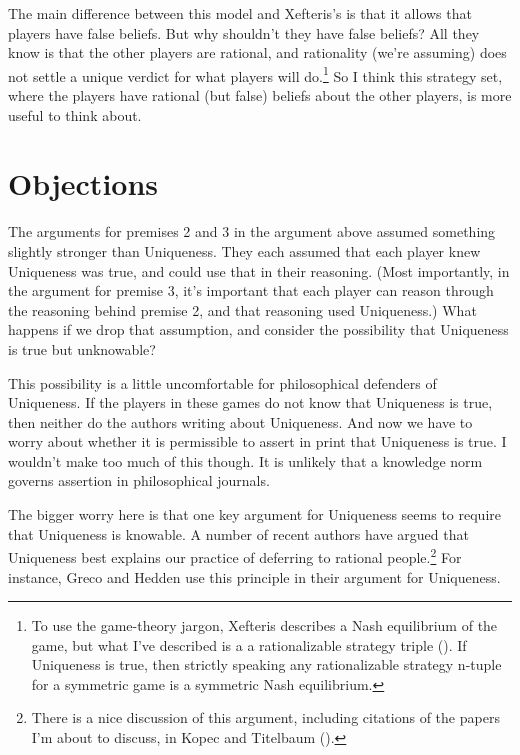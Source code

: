 \documentclass[
  11pt,
  letterpaper,
  DIV=11,
  numbers=noendperiod,
  twoside]{scrartcl}
\begin{document}
The main difference between this model and Xefteris's is that it allows
that players have false beliefs. But why shouldn't they have false
beliefs? All they know is that the other players are rational, and
rationality (we're assuming) does not settle a unique verdict for what
players will do.\footnote{To use the game-theory jargon, Xefteris
  describes a Nash equilibrium of the game, but what I've described is a
  a rationalizable strategy triple (). If Uniqueness is true, then strictly speaking any
  rationalizable strategy n-tuple for a symmetric game is a symmetric
  Nash equilibrium.} So I think this strategy set, where the players
have rational (but false) beliefs about the other players, is more
useful to think about.

\section{Objections}\label{objections}

The arguments for premises 2 and 3 in the argument above assumed
something slightly stronger than Uniqueness. They each assumed that each
player knew Uniqueness was true, and could use that in their reasoning.
(Most importantly, in the argument for premise 3, it's important that
each player can reason through the reasoning behind premise 2, and that
reasoning used Uniqueness.) What happens if we drop that assumption, and
consider the possibility that Uniqueness is true but unknowable?

This possibility is a little uncomfortable for philosophical defenders
of Uniqueness. If the players in these games do not know that Uniqueness
is true, then neither do the authors writing about Uniqueness. And now
we have to worry about whether it is permissible to assert in print that
Uniqueness is true. I wouldn't make too much of this though. It is
unlikely that a knowledge norm governs assertion in philosophical
journals.

The bigger worry here is that one key argument for Uniqueness seems to
require that Uniqueness is knowable. A number of recent authors have
argued that Uniqueness best explains our practice of deferring to
rational people.\footnote{There is a nice discussion of this argument,
  including citations of the papers I'm about to discuss, in Kopec and
  Titelbaum ().} For
instance, Greco and Hedden use this principle in their argument for
Uniqueness.
\end{document}

